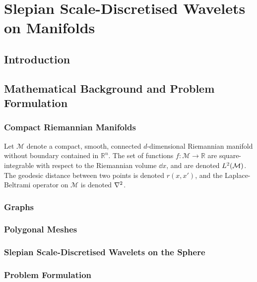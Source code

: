 \chapter{Slepian Scale-Discretised Wavelets on Manifolds}\label{sec:chapter4}

\section{Introduction}

\section{Mathematical Background and Problem Formulation}

\subsection{Compact Riemannian Manifolds}

Let \(\mathcal{M}\) denote a compact, smooth, connected \(d\)-dimensional Riemannian manifold without boundary contained in \(\mathbb{R}^{n}\).
The set of functions \(f : \mathcal{M} \to \mathbb{R}\) are square-integrable with respect to the Riemannian volume \(\dd{x}\), and are denoted \(L^{2}(\mathcal{M})\).
The geodesic distance between two points is denoted \(r(x,x')\), and the Laplace-Beltrami operator on \(\mathcal{M}\) is denoted \(\laplacian{}\).

\subsection{Graphs}

\subsection{Polygonal Meshes}



\subsection{Slepian Scale-Discretised Wavelets on the Sphere}

\subsection{Problem Formulation}



